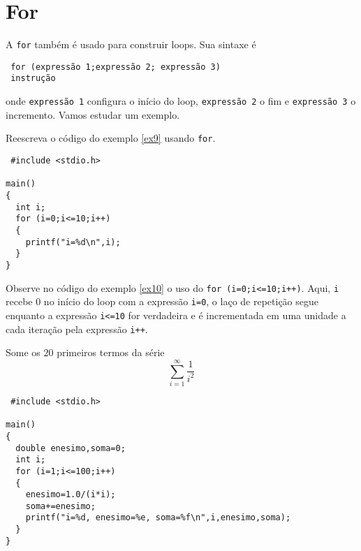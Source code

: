 \section{For}
A \verb|for| também é usado para construir loops. Sua sintaxe é
\begin{verbatim}
 for (expressão 1;expressão 2; expressão 3)
 instrução 
\end{verbatim}
onde \verb|expressão 1| configura o início do loop, \verb|expressão 2| o fim e \verb|expressão 3| o incremento. Vamos estudar um exemplo.
\begin{ex}\label{ex11}Reescreva o código do exemplo \ref{ex9} usando \verb|for|.
\end{ex}
\begin{verbatim}
 #include <stdio.h>

main()
{
  int i;
  for (i=0;i<=10;i++)
  {
    printf("i=%d\n",i);
  }
}
\end{verbatim}
Observe no código do exemplo \ref{ex10} o uso do \verb|for (i=0;i<=10;i++)|. Aqui, \verb|i| recebe $0$ no início do loop com a expressão \verb|i=0|, o laço de repetição segue enquanto a expressão \verb|i<=10| for verdadeira e é incrementada em uma unidade a cada iteração pela expressão \verb|i++|.
\begin{ex}\label{ex12}Some os 20 primeiros termos da série
$$
\sum_{i=1}^\infty \frac{1}{i^2}
$$
\end{ex}
\begin{verbatim}
 #include <stdio.h>

main()
{
  double enesimo,soma=0;
  int i;
  for (i=1;i<=100;i++)
  {
    enesimo=1.0/(i*i);
    soma+=enesimo;
    printf("i=%d, enesimo=%e, soma=%f\n",i,enesimo,soma);
  }
}
\end{verbatim}


